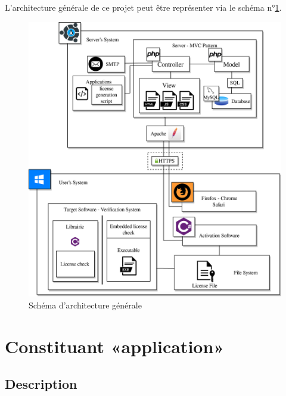 L'architecture générale de ce projet peut être représenter via 
le schéma n°\ref{fig:fig1}.\newline

\begin{figure}[hp!]
	\centering
	\includegraphics[width=\textwidth]{../png/DAT_general.png}
	\caption{Schéma d'architecture générale}
	\label{fig:fig1}
\end{figure}
\newpage

\section{Constituant «application»}

\subsection{Description}

